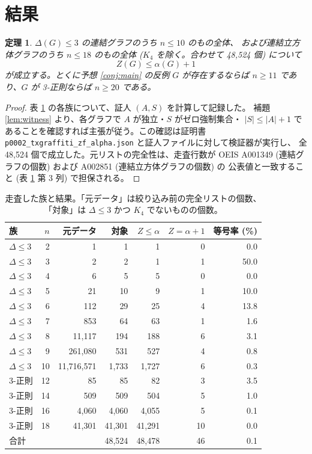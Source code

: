 \documentclass[paper=a4,fontsize=10.5pt,jafontsize=10.5pt]{jlreq}
\theoremstyle{plain}
\newtheorem{theorem}{定理}[section]
\theoremstyle{definition}
\begin{document}
\section{結果}

\begin{theorem}\label{thm:main}
$\Delta(G) \le 3$ の連結グラフのうち $n \le 10$ のもの全体、
および連結立方体グラフのうち $n \le 18$ のもの全体
($K_4$ を除く。合わせて 48,524 個) について
\[ Z(G) \le \alpha(G) + 1 \]
が成立する。とくに予想 \ref{conj:main} の反例 $G$ が存在するならば
$n \ge 11$ であり、$G$ が 3-正則ならば $n \ge 20$ である。
\end{theorem}

\begin{proof}
表 \ref{tab:fams} の各族について、証人 $(A,S)$ を計算して記録した。
補題 \ref{lem:witness} より、各グラフで $A$ が独立・$S$ がゼロ強制集合・
$|S| \le |A|+1$ であることを確認すれば主張が従う。この確認は証明書
\texttt{p0002\_txgraffiti\_zf\_alpha.json} と証人ファイルに対して検証器が実行し、
全 48,524 個で成立した。元リストの完全性は、走査行数が
OEIS A001349 (連結グラフの個数) および A002851 (連結立方体グラフの個数) の
公表値と一致すること (表 \ref{tab:fams} 第 3 列) で担保される。
\end{proof}

\begin{table}[htbp]
\centering
\caption{走査した族と結果。「元データ」は絞り込み前の完全リストの個数、
「対象」は $\Delta \le 3$ かつ $K_4$ でないものの個数。}
\label{tab:fams}
\begin{tabular}{lrrrrrr}
\toprule
族 & $n$ & 元データ & 対象 & $Z \le \alpha$ & $Z = \alpha+1$ & 等号率 (\%) \\
\midrule
$\Delta \le 3$ & 2 & 1 & 1 & 1 & 0 & 0.0 \\
$\Delta \le 3$ & 3 & 2 & 2 & 1 & 1 & 50.0 \\
$\Delta \le 3$ & 4 & 6 & 5 & 5 & 0 & 0.0 \\
$\Delta \le 3$ & 5 & 21 & 10 & 9 & 1 & 10.0 \\
$\Delta \le 3$ & 6 & 112 & 29 & 25 & 4 & 13.8 \\
$\Delta \le 3$ & 7 & 853 & 64 & 63 & 1 & 1.6 \\
$\Delta \le 3$ & 8 & 11,117 & 194 & 188 & 6 & 3.1 \\
$\Delta \le 3$ & 9 & 261,080 & 531 & 527 & 4 & 0.8 \\
$\Delta \le 3$ & 10 & 11,716,571 & 1,733 & 1,727 & 6 & 0.3 \\
3-正則 & 12 & 85 & 85 & 82 & 3 & 3.5 \\
3-正則 & 14 & 509 & 509 & 504 & 5 & 1.0 \\
3-正則 & 16 & 4,060 & 4,060 & 4,055 & 5 & 0.1 \\
3-正則 & 18 & 41,301 & 41,301 & 41,291 & 10 & 0.0 \\
\midrule
\multicolumn{3}{l}{合計} & 48,524 & 48,478 & 46
& 0.1 \\
\bottomrule
\end{tabular}
\end{table}
\end{document}
